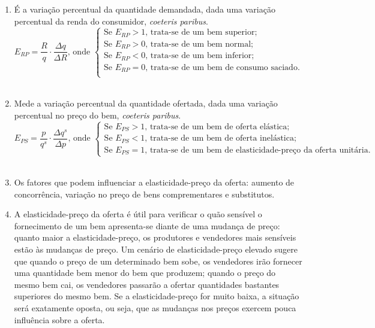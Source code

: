 \documentclass[a4paper, 12pt]{article}
\begin{document}
\begin{enumerate}
	\item É a variação percentual da quantidade demandada, dada uma variação percentual da renda do consumidor, \textit{coeteris paribus}.\\
	$$E_{RP} = \dfrac{R}{q} \cdot \dfrac{\Delta q}{\Delta R} \textrm{, onde }
		\begin{cases}
		\textrm{Se } E_{RP} > 1 \textrm{, trata-se de um bem superior;}\\
		\textrm{Se } E_{RP} > 0 \textrm{, trata-se de um bem normal;}\\
		\textrm{Se } E_{RP} < 0 \textrm{, trata-se de um bem inferior;}\\
		\textrm{Se } E_{RP} = 0 \textrm{, trata-se de um bem de consumo saciado.}\\
		\end{cases}$$
		\\
	
	\item Mede a variação percentual da quantidade ofertada, dada uma variação percentual no preço do bem, \textit{coeteris paribus}.\\
	$$E_{PS} = \dfrac{p}{q^s} \cdot \dfrac{\Delta q^s}{\Delta p} \textrm{, onde }
	\begin{cases}
	\textrm{Se } E_{PS} > 1 \textrm{, trata-se de um bem de oferta elástica;}\\
	\textrm{Se } E_{PS} < 1 \textrm{, trata-se de um bem de oferta inelástica;}\\
	\textrm{Se } E_{PS} = 1 \textrm{, trata-se de um bem de elasticidade-preço da oferta unitária.}
	\end{cases}$$
	\\

	\item Os fatores que podem influenciar a elasticidade-preço da oferta: aumento de concorrência, variação no preço de bens comprementares e substitutos.
	\\

	\item A elasticidade-preço da oferta é útil para verificar o quão sensível o fornecimento de um bem apresenta-se diante de uma mudança de preço: quanto maior a elasticidade-preço, os produtores e vendedores mais sensíveis estão às mudanças de preço. Um cenário de elasticidade-preço elevado sugere que quando o preço de um determinado bem sobe, os vendedores irão fornecer uma quantidade bem menor do bem que produzem; quando o preço do mesmo bem cai, os vendedores passarão a ofertar quantidades bastantes superiores do mesmo bem. Se a elasticidade-preço for muito baixa, a situação será exatamente oposta, ou seja, que as mudanças nos preços exercem pouca influência sobre a oferta.
	\\


\end{enumerate}
\end{document}
